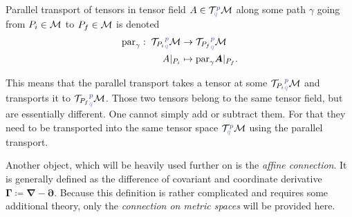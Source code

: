 \begin{definition}
    Parallel transport of tensors in tensor field $A\in \TT^{\bluee p}_{\blueee q} \M$ along some path $\gamma$ going from $P_i\in\mathcal{M}$ to $P_f\in\mathcal{M}$ is denoted
    \begin{align*}
        \Par_\gamma:\; {\TT _{P_i}}^{\bluee p}_{\blueee q}\M&\rightarrow {\TT_{P_f}}^{\bluee p}_{\blueee q}\M\\
        A|_{P_i} &\mapsto \Par_\gamma \bm A|_{P_f}.
    \end{align*}
\end{definition}
This means that the parallel transport takes a tensor at some ${\TT_{P_i}}^{\bluee p}_{\blueee q} \M$ and transports it to ${\TT_{P_f}}^{\bluee p}_{\blueee q} \M$.  Those two tensors belong to the same tensor field, but are essentially different. One cannot simply add or subtract them. For that they need to be transported into the same tensor space $\TT^{\bluee p}_{\blueee q} \M$ using the parallel transport.


Another object, which will be heavily used further on is the \emph{affine connection}. It is generally defined as the difference of covariant and coordinate derivative
$\bm \Gamma\coloneqq \bm\nabla-\bm\partial$. Because this definition is rather complicated and requires some additional theory, only the \emph{connection on metric spaces} will be provided here. 

